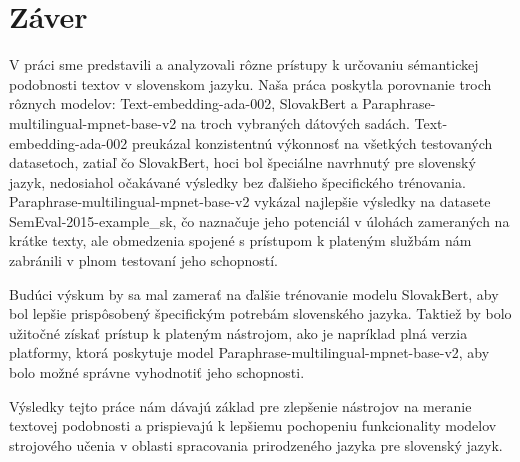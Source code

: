 \chapter*{Záver}  %

V práci sme predstavili a analyzovali rôzne prístupy k určovaniu sémantickej podobnosti textov v slovenskom jazyku. Naša práca poskytla porovnanie troch rôznych modelov: Text-embedding-ada-002, SlovakBert a Paraphrase-multilingual-mpnet-base-v2 na troch vybraných dátových sadách. Text-embedding-ada-002 preukázal konzistentnú výkonnosť na všetkých testovaných datasetoch, zatiaľ čo SlovakBert, hoci bol špeciálne navrhnutý pre slovenský jazyk, nedosiahol očakávané výsledky bez ďalšieho špecifického trénovania. Paraphrase-multilingual-mpnet-base-v2 vykázal najlepšie výsledky na datasete SemEval-2015-example\_sk, čo naznačuje jeho potenciál v úlohách zameraných na krátke texty, ale obmedzenia spojené s prístupom k plateným službám nám zabránili v plnom testovaní jeho schopností.
\vspace{1em}

\noindent
Budúci výskum by sa mal zamerať na ďalšie trénovanie modelu SlovakBert, aby bol lepšie prispôsobený špecifickým potrebám slovenského jazyka. Taktiež by bolo užitočné získať prístup k plateným nástrojom, ako je napríklad plná verzia platformy, ktorá poskytuje model Paraphrase-multilingual-mpnet-base-v2, aby bolo možné správne vyhodnotiť jeho schopnosti. 
\vspace{1em}

\noindent
Výsledky tejto práce nám dávajú základ pre zlepšenie nástrojov na meranie textovej podobnosti a prispievajú k lepšiemu pochopeniu funkcionality modelov strojového učenia v oblasti spracovania prirodzeného jazyka pre slovenský jazyk.

